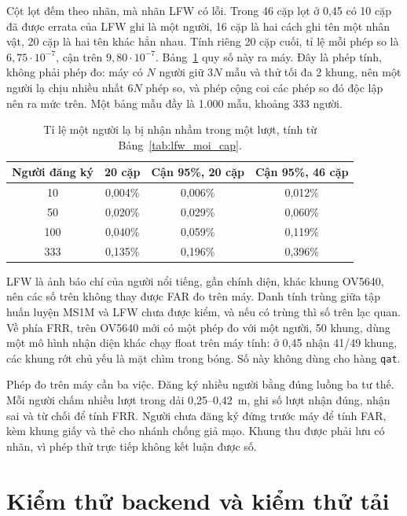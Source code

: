 \documentclass[../DoAn.tex]{subfiles}
\begin{document}
Cột lọt đếm theo nhãn, mà nhãn LFW có lỗi. Trong 46 cặp lọt ở 0,45 có 10 cặp đã được errata của LFW ghi là một người, 16 cặp là hai cách
ghi tên một nhân vật, 20 cặp là hai tên khác hẳn nhau. Tính riêng 20 cặp cuối, tỉ lệ mỗi phép so là $6{,}75\cdot10^{-7}$, cận trên
$9{,}80\cdot10^{-7}$. Bảng~\ref{tab:nguoi_la} quy số này ra máy. Đây là phép tính, không phải phép đo: máy có $N$ người giữ $3N$ mẫu và thử tối đa
2 khung, nên một người lạ chịu nhiều nhất $6N$ phép so, và phép cộng coi các phép so đó độc lập nên ra mức trên. Một bảng mẫu đầy là
1.000 mẫu, khoảng 333 người.

\begin{table}[!htb]
\centering
\small
\caption{Tỉ lệ một người lạ bị nhận nhầm trong một lượt, tính từ Bảng~\ref{tab:lfw_moi_cap}.}
\label{tab:nguoi_la}
\begin{tabular}{|c|c|c|c|}
\hline
\textbf{Người đăng ký} & \textbf{20 cặp} & \textbf{Cận 95\%, 20 cặp} & \textbf{Cận 95\%, 46 cặp} \\
\hline
10 & 0,004\% & 0,006\% & 0,012\% \\
\hline
50 & 0,020\% & 0,029\% & 0,060\% \\
\hline
100 & 0,040\% & 0,059\% & 0,119\% \\
\hline
333 & 0,135\% & 0,196\% & 0,396\% \\
\hline
\end{tabular}
\end{table}

LFW là ảnh báo chí của người nổi tiếng, gần chính diện, khác khung OV5640, nên các số trên không thay được FAR đo trên máy. Danh tính trùng
giữa tập huấn luyện MS1M và LFW chưa được kiểm, và nếu có trùng thì số trên lạc quan. Về phía FRR, trên OV5640 mới có một phép đo với một
người, 50 khung, dùng một mô hình nhận diện khác chạy float trên máy tính: ở 0,45 nhận 41/49 khung, các khung rớt chủ yếu là mặt chìm trong
bóng. Số này không dùng cho hàng \texttt{qat}.

Phép đo trên máy cần ba việc. Đăng ký nhiều người bằng đúng luồng ba tư thế. Mỗi người chấm nhiều lượt trong dải 0,25--0,42~m, ghi số
lượt nhận đúng, nhận sai và từ chối để tính FRR. Người chưa đăng ký đứng trước máy để tính FAR, kèm khung giấy và thẻ cho nhánh chống
giả mạo. Khung thu được phải lưu có nhãn, vì phép thử trực tiếp không kết luận được số.

\section{Kiểm thử backend và kiểm thử tải}
\label{section:5.6}
\end{document}
